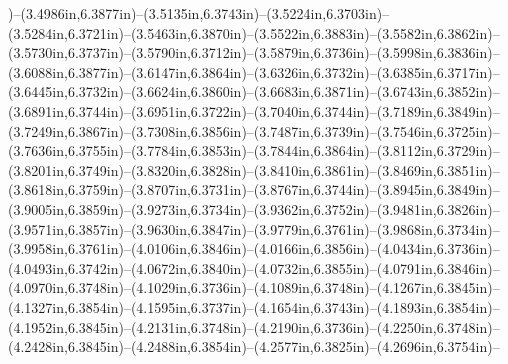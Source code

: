 )--(3.4986in,6.3877in)--(3.5135in,6.3743in)--(3.5224in,6.3703in)--(3.5284in,6.3721in)--(3.5463in,6.3870in)--(3.5522in,6.3883in)--(3.5582in,6.3862in)--(3.5730in,6.3737in)--(3.5790in,6.3712in)--(3.5879in,6.3736in)--(3.5998in,6.3836in)--(3.6088in,6.3877in)--(3.6147in,6.3864in)--(3.6326in,6.3732in)--(3.6385in,6.3717in)--(3.6445in,6.3732in)--(3.6624in,6.3860in)--(3.6683in,6.3871in)--(3.6743in,6.3852in)--(3.6891in,6.3744in)--(3.6951in,6.3722in)--(3.7040in,6.3744in)--(3.7189in,6.3849in)--(3.7249in,6.3867in)--(3.7308in,6.3856in)--(3.7487in,6.3739in)--(3.7546in,6.3725in)--(3.7636in,6.3755in)--(3.7784in,6.3853in)--(3.7844in,6.3864in)--(3.8112in,6.3729in)--(3.8201in,6.3749in)--(3.8320in,6.3828in)--(3.8410in,6.3861in)--(3.8469in,6.3851in)--(3.8618in,6.3759in)--(3.8707in,6.3731in)--(3.8767in,6.3744in)--(3.8945in,6.3849in)--(3.9005in,6.3859in)--(3.9273in,6.3734in)--(3.9362in,6.3752in)--(3.9481in,6.3826in)--(3.9571in,6.3857in)--(3.9630in,6.3847in)--(3.9779in,6.3761in)--(3.9868in,6.3734in)--(3.9958in,6.3761in)--(4.0106in,6.3846in)--(4.0166in,6.3856in)--(4.0434in,6.3736in)--(4.0493in,6.3742in)--(4.0672in,6.3840in)--(4.0732in,6.3855in)--(4.0791in,6.3846in)--(4.0970in,6.3748in)--(4.1029in,6.3736in)--(4.1089in,6.3748in)--(4.1267in,6.3845in)--(4.1327in,6.3854in)--(4.1595in,6.3737in)--(4.1654in,6.3743in)--(4.1893in,6.3854in)--(4.1952in,6.3845in)--(4.2131in,6.3748in)--(4.2190in,6.3736in)--(4.2250in,6.3748in)--(4.2428in,6.3845in)--(4.2488in,6.3854in)--(4.2577in,6.3825in)--(4.2696in,6.3754in)--
